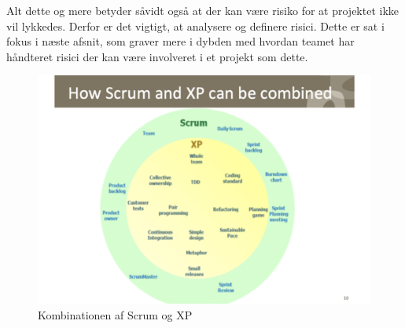 Alt dette og mere %
betyder såvidt også at der kan være risiko for at projektet ikke vil lykkedes. Derfor er det vigtigt, at analysere og definere risici. Dette er sat i fokus i næste afsnit, som graver mere i dybden med hvordan teamet har håndteret risici der kan være involveret i et projekt som dette.

\begin{figure}
    \includegraphics[width=\linewidth]{figures/XP&Scrum.png}
    \caption{Kombinationen af Scrum og XP}
    \label{fig:Kombi}
\end{figure}

